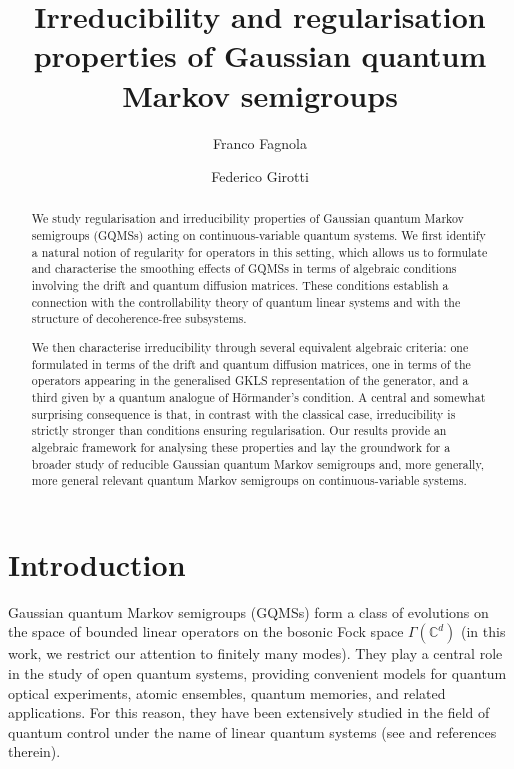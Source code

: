 \documentclass[preprint]{elsarticle}
\title{Irreducibility and regularisation properties of Gaussian quantum Markov semigroups}
\date{}
\author[1]{Franco Fagnola}
\affiliation[1]{organization={Dipartimento di Matematica, Politecnico di Milano},
addressline={Via Edoardo Bonardi 9},
postcode={20133},
city={Milano},
country={Italy}}
\author[1]{Federico Girotti}
\theoremstyle{definition}
\def\CC{\mathbb{C}}
\def\FS{\Gamma(\CC^d)}
\begin{document}
\begin{abstract}
We study regularisation and irreducibility properties of Gaussian quantum Markov semigroups (GQMSs) acting on continuous-variable quantum systems. We first identify a natural notion of regularity for operators in this setting, which allows us to formulate and characterise the smoothing effects of GQMSs in terms of algebraic conditions involving the drift and quantum diffusion matrices. These conditions establish a connection with the controllability theory of quantum linear systems and with the structure of decoherence-free subsystems.

We then characterise irreducibility through several equivalent algebraic criteria: one formulated in terms of the drift and quantum diffusion matrices, one in terms of the operators appearing in the generalised GKLS representation of the generator, and a third given by a quantum analogue of H\"ormander's condition. A central and somewhat surprising consequence is that, in contrast with the classical case, irreducibility is strictly stronger than conditions ensuring regularisation. Our results provide an algebraic framework for analysing these properties and lay the groundwork for a broader study of reducible Gaussian quantum Markov semigroups and, more generally, more general relevant quantum Markov semigroups on continuous-variable systems.
\end{abstract}
\maketitle

\makeatletter
\def\ps@pprintTitle{%
  \let\@oddhead\@empty
  \let\@evenhead\@empty
  \let\@oddfoot\@empty
  \let\@evenfoot\@oddfoot
}
\makeatother

\section{Introduction}

Gaussian quantum Markov semigroups (GQMSs) form a class of evolutions on the space of bounded linear operators on the bosonic Fock space $\FS$ (in this work, we restrict our attention to finitely many modes). They play a central role in the study of open quantum systems, providing convenient models for quantum optical experiments, atomic ensembles, quantum memories, and related applications. For this reason, they have been extensively studied in the field of quantum control under the name of linear quantum systems (see \cite{DZ22,NY17} and references therein).
\end{document}
